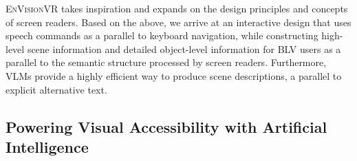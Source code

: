 \textsc{EnVisionVR} takes inspiration and expands on the design principles and concepts of screen readers. %
Based on the above, we arrive at an interactive design that uses speech commands as a parallel to keyboard navigation, while constructing high-level scene information and detailed object-level information for BLV users as a parallel to the semantic structure processed by screen readers. Furthermore, %
VLMs provide a highly efficient way to produce scene descriptions, %
a parallel to explicit alternative text.

\subsection{Powering Visual Accessibility with Artificial Intelligence}


